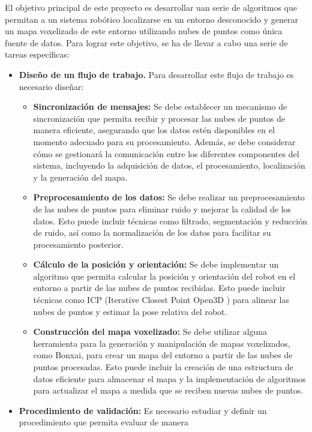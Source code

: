 \documentclass[12pt, a4paper, twoside]{article}
\begin{document}
El objetivo principal de este proyecto es desarrollar uan serie de algoritmos que permitan a un sistema robótico localizarse en un 
entorno desconocido y generar un mapa voxelizado de este entorno utilizando nubes de puntos como única fuente de datos. 
Para lograr este objetivo, se ha de llevar a cabo una serie de tareas específicas:
\begin{itemize}
  \item \textbf{Diseño de un flujo de trabajo.} Para desarrollar este flujo de trabajo es necesario diseñar:
   \begin{itemize}
    \item \textbf{Sincronización de mensajes:} Se debe establecer un mecanismo de sincronización que permita 
      recibir y procesar las nubes de puntos de manera eficiente, asegurando que los datos estén disponibles en el momento 
      adecuado para su procesamiento. Además, se debe considerar cómo se gestionará la comunicación entre los diferentes 
      componentes del sistema, incluyendo la adquisición de datos, el procesamiento, localización y la generación del mapa.
    \item \textbf{Preprocesamiento de los datos:} Se debe realizar un preprocesamiento de las nubes de puntos 
      para eliminar ruido y mejorar la calidad de los datos. Esto puede incluir técnicas como filtrado, segmentación y 
      reducción de ruido, así como la normalización de los datos para facilitar su procesamiento posterior.
    \item \textbf{Cálculo de la posición y orientación:} Se debe implementar un algoritmo que permita calcular la posición y orientación del 
      robot en el entorno a partir de las nubes de puntos recibidas. Esto puede incluir técnicas como ICP (Iterative Closest Point Open3D \cite{Zhou2018}) 
      para alinear las nubes de puntos y estimar la pose relativa del robot.
    \item \textbf{Construcción del mapa voxelizado:} Se debe utilizar alguna herramienta para la generación y manipulación 
      de mapas voxelizados, como Bonxai\cite{faconti2024bonxai}, para crear un mapa del entorno a partir de las nubes de puntos procesadas. 
      Esto puede incluir la creación de una estructura de datos eficiente para almacenar el mapa y la implementación de 
      algoritmos para actualizar el mapa a medida que se reciben nuevas nubes de puntos.
    \end{itemize}
  \item \textbf{Procedimiento de validación:} Es necesario estudiar y definir un procedimiento que permita evaluar de manera 

\end{itemize}
\end{document}
